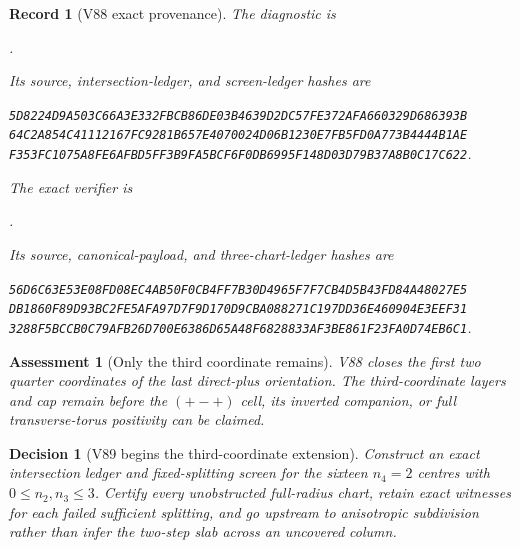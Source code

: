 \documentclass[11pt,oneside]{article}
\newtheorem{assessment}[theorem]{Assessment}
\newtheorem{record}[theorem]{Record}
\newtheorem{decision}[theorem]{Decision}
\theoremstyle{definition}
\theoremstyle{remark}
\begin{document}
\begin{record}[V88 exact provenance]
\label{rec:newv88-provenance}
The diagnostic is
\begin{center}\footnotesize
{}.
\end{center}
Its source, intersection-ledger, and screen-ledger hashes are
\begin{center}\scriptsize
\texttt{5D8224D9A503C66A3E332FBCB86DE03B4639D2DC57FE372AFA660329D686393B}\\
\texttt{64C2A854C41112167FC9281B657E4070024D06B1230E7FB5FD0A773B4444B1AE}\\
\texttt{F353FC1075A8FE6AFBD5FF3B9FA5BCF6F0DB6995F148D03D79B37A8B0C17C622}.
\end{center}
The exact verifier is
\begin{center}\footnotesize
{}.
\end{center}
Its source, canonical-payload, and three-chart-ledger hashes are
\begin{center}\scriptsize
\texttt{56D6C63E53E08FD08EC4AB50F0CB4FF7B30D4965F7F7CB4D5B43FD84A48027E5}\\
\texttt{DB1860F89D93BC2FE5AFA97D7F9D170D9CBA088271C197DD36E460904E3EEF31}\\
\texttt{3288F5BCCB0C79AFB26D700E6386D65A48F6828833AF3BE861F23FA0D74EB6C1}.
\end{center}
\end{record}

\begin{assessment}[Only the third coordinate remains]
\label{ass:newv88}
V88 closes the first two quarter coordinates of the last direct-plus
orientation.  The third-coordinate layers and cap remain before the
\((+-+)\) cell, its inverted companion, or full transverse-torus
positivity can be claimed.
\end{assessment}

\begin{decision}[V89 begins the third-coordinate extension]
\label{dec:newv88-next}
Construct an exact intersection ledger and fixed-splitting screen for
the sixteen \(n_4=2\) centres with
\(0\leq n_2,n_3\leq3\).  Certify every unobstructed full-radius chart,
retain exact witnesses for each failed sufficient splitting, and go
upstream to anisotropic subdivision rather than infer the two-step
slab across an uncovered column.
\end{decision}
\end{document}
